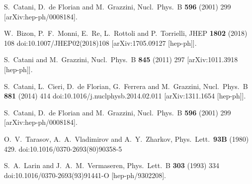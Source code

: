 \documentclass[12pt]{article}
\begin{document}
\begin{thebibliography}{99}
  S.~Catani, D.~de Florian and M.~Grazzini,
  Nucl.\ Phys.\  B {\bf 596} (2001) 299
[arXiv:hep-ph/0008184].

  W.~Bizon, P.~F.~Monni, E.~Re, L.~Rottoli and P.~Torrielli,
  JHEP {\bf 1802} (2018) 108
  doi:10.1007/JHEP02(2018)108
  [arXiv:1705.09127 [hep-ph]].

  
  S.~Catani and M.~Grazzini,
  Nucl.\ Phys.\ B {\bf 845} (2011) 297
[arXiv:1011.3918 [hep-ph]].

  S.~Catani, L.~Cieri, D.~de Florian, G.~Ferrera and M.~Grazzini,
  Nucl.\ Phys.\ B {\bf 881} (2014) 414
  doi:10.1016/j.nuclphysb.2014.02.011
  [arXiv:1311.1654 [hep-ph]].
  
  S.~Catani, D.~de Florian and M.~Grazzini,
  Nucl.\ Phys.\  B {\bf 596} (2001) 299
[arXiv:hep-ph/0008184].

  O.~V.~Tarasov, A.~A.~Vladimirov and A.~Y.~Zharkov,
  Phys.\ Lett.\  {\bf 93B} (1980) 429.
  doi:10.1016/0370-2693(80)90358-5
  
  S.~A.~Larin and J.~A.~M.~Vermaseren,
  Phys.\ Lett.\ B {\bf 303} (1993) 334
  doi:10.1016/0370-2693(93)91441-O
  [hep-ph/9302208].




\end{thebibliography}
\end{document}
